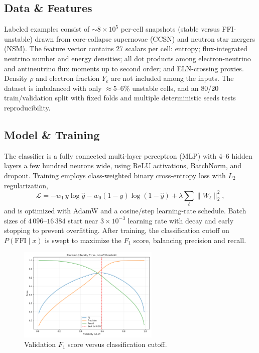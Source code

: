 \documentclass[10pt]{article}
\begin{document}
\begin{center}
\subsection*{Data \& Features}
Labeled examples consist of $\sim 8\times 10^5$ per-cell snapshots (stable versus FFI-unstable) drawn from core-collapse supernovae (CCSN) and neutron star mergers (NSM).
The feature vector contains 27 scalars per cell: entropy; flux-integrated neutrino number and energy densities; all dot products among electron-neutrino and antineutrino flux moments up to second order; and ELN-crossing proxies. Density $\rho$ and electron fraction $Y_e$ are not included among the inputs.
The dataset is imbalanced with only $\approx$5--6\% unstable cells, and an 80/20 train/validation split with fixed folds and multiple deterministic seeds tests reproducibility.

\subsection*{Model \& Training}
The classifier is a fully connected multi-layer perceptron (MLP) with 4--6 hidden layers a few hundred neurons wide, using ReLU activations, BatchNorm, and dropout.
Training employs class-weighted binary cross-entropy loss with $L_2$ regularization,
\begin{equation*}
\mathcal{L} = -w_1\, y\log \hat y - w_0 (1-y)\log(1-\hat y) + \lambda \sum_{\ell}\lVert W_\ell\rVert_2^2,
\end{equation*}
and is optimized with AdamW and a cosine/step learning-rate schedule.
Batch sizes of $4\,096$--$16\,384$ start near $3\times 10^{-3}$ learning rate with decay and early stopping to prevent overfitting.
After training, the classification cutoff on $P(\mathrm{FFI}\mid x)$ is swept to maximize the $F_1$ score, balancing precision and recall.

\begin{figure}[h]
    \centering
    \includegraphics[width=0.6\textwidth]{cutoff_sweep.png}
    \caption{Validation $F_1$ score versus classification cutoff.}
\end{figure}


\end{center}
\end{document}
